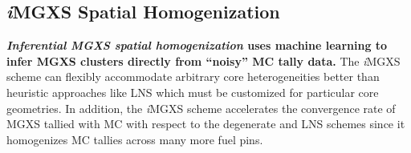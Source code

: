 \documentclass[12pt,twoside]{mitthesis-exec}
\begin{document}



\subsection*{\textit{i}MGXS Spatial Homogenization}

\textbf{\textit{Inferential MGXS spatial homogenization} uses machine learning to infer MGXS clusters directly from ``noisy'' MC tally data.} The \textit{i}MGXS scheme can flexibly accommodate arbitrary core heterogeneities better than heuristic approaches like LNS which must be customized for particular core geometries. In addition, the \textit{i}MGXS scheme accelerates the convergence rate of MGXS tallied with MC with respect to the degenerate and LNS schemes since it homogenizes MC tallies across many more fuel pins.

\end{document}
